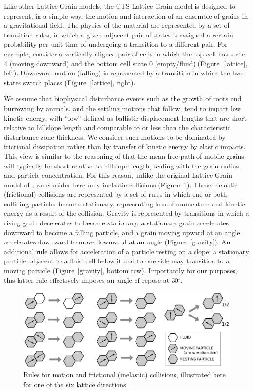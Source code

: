 \documentclass[esurf, manuscript]{copernicus}
\begin{document}
Like other Lattice Grain models, the CTS Lattice Grain model is designed to represent, in a simple way, the motion and interaction of an ensemble of grains in a gravitational field. The physics of the material are represented by a set of transition rules, in which a given adjacent pair of states is assigned a certain probability per unit time of undergoing a transition to a different pair. For example, consider a vertically aligned pair of cells in which the top cell has state 4 (moving downward) and the bottom cell state 0 (empty/fluid) (Figure~\ref{lattice}, left). Downward motion (falling) is represented by a transition in which the two states switch places (Figure~\ref{lattice}, right).

We assume that biophysical disturbance events such as the growth of roots and burrowing by animals, and the settling motions that follow, tend to impart low kinetic energy, with ``low'' defined as ballistic displacement lengths that are short relative to hillslope length and comparable to or less than the characteristic disturbance-zone thickness. We consider such motions to be dominated by frictional dissipation rather than by transfer of kinetic energy by elastic impacts. This view is similar to the reasoning of \citet{furbish2009statistical} that the mean-free-path of mobile grains will typically be short relative to hillslope length, scaling with the grain radius and particle concentration. For this reason, unlike the original Lattice Grain model of \citet{tucker2016celllab}, we consider here only inelastic collisions (Figure~\ref{frictional}). These inelastic (frictional) collisions are represented by a set of rules in which one or both colliding particles become stationary, representing loss of momentum and kinetic energy as a result of the collision. Gravity is represented by transitions in which a rising grain decelerates to become stationary, a stationary grain accelerates downward to become a falling particle, and a grain moving upward at an angle accelerates downward to move downward at an angle (Figure~\ref{gravity}). An additional rule allows for acceleration of a particle resting on a slope: a stationary particle adjacent to a fluid cell below it and to one side may transition to a moving particle %
(Figure~\ref{gravity}, bottom row). Importantly for our purposes, this latter rule effectively imposes an angle of repose at 30$^\circ$.

\begin{figure}[t]
\includegraphics{Figures/lattice_grain_friction_rules.pdf}
\caption{Rules for motion and frictional (inelastic) collisions, illustrated here for one of the six lattice directions.}
\label{frictional}
\end{figure}
\end{document}
